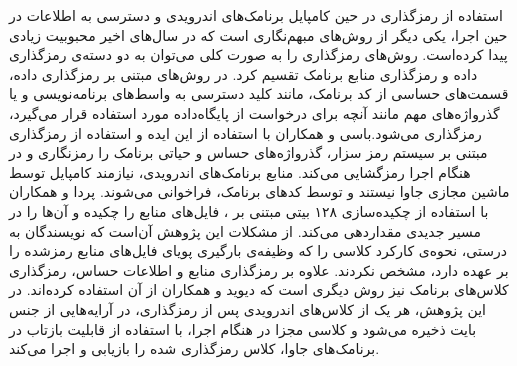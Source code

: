 استفاده از رمزگذاری در حین کامپایل برنامک‌های اندرویدی و دسترسی به اطلاعات در حین اجرا، یکی دیگر از روش‌های مبهم‌نگاری است که در سال‌های اخیر محبوبیت زیادی پیدا کرده‌است. روش‌های رمز‌گذاری را به صورت کلی می‌توان به دو دسته‌ی رمز‌گذاری داده و رمزگذاری منابع برنامک تقسیم کرد. در روش‌های مبتنی بر رمز‌گذاری داده، قسمت‌های حساسی از کد برنامک، مانند کلید‌ دسترسی به واسط‌های برنامه‌نویسی و یا گذرواژه‌های مهم مانند آنچه برای درخواست از پایگاه‌داده مورد استفاده قرار می‌گیرد، رمز‌گذاری می‌شود.باسی و همکاران با استفاده از این ایده و استفاده از رمز‌گذاری مبتنی بر سیستم رمز سزار‌، گذرواژه‌های حساس و حیاتی برنامک را رمزنگاری و در هنگام اجرا رمز‌گشایی می‌کند. منابع برنامک‌های اندرویدی، نیازمند کامپایل توسط ماشین مجازی جاوا نیستند و توسط کد‌های برنامک، فراخوانی می‌شوند. پردا و همکاران با استفاده از چکیده‌سازی ۱۲۸ بیتی مبتنی بر ، فایل‌های منابع را چکیده و آن‌ها را در مسیر جدیدی مقدار‌دهی می‌کند. از مشکلات این پژوهش آن‌است که نویسندگان به درستی، نحوه‌ی کارکرد کلاسی را که وظیفه‌ی بارگیری پویای فایل‌های منابع رمزشده را بر عهده دارد، مشخص نکردند. علاوه بر رمز‌گذاری منابع و اطلاعات حساس، رمز‌گذاری کلاس‌های برنامک نیز روش دیگری است که دیوید و همکاران از آن استفاده کرده‌اند. در این پژوهش، هر یک از کلاس‌های اندرویدی پس از رمز‌گذاری، در آرایه‌هایی از جنس بایت ذخیره می‌شود و کلاسی مجزا در هنگام اجرا، با استفاده از قابلیت بازتاب در برنامک‌های جاوا، کلاس رمز‌گذاری شده را بازیابی و اجرا می‌کند.

